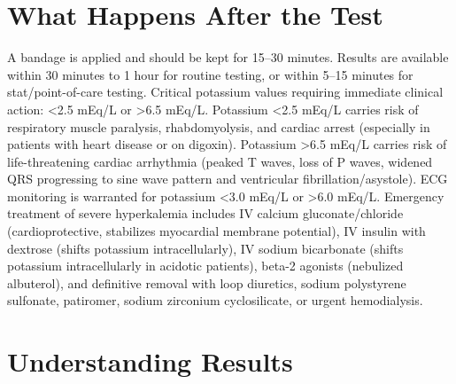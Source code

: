 \section*{What Happens After the Test}
A bandage is applied and should be kept for 15--30 minutes. Results are available within 30 minutes to 1 hour for routine testing, or within 5--15 minutes for stat/point-of-care testing. Critical potassium values requiring immediate clinical action: <2.5 mEq/L or >6.5 mEq/L. Potassium <2.5 mEq/L carries risk of respiratory muscle paralysis, rhabdomyolysis, and cardiac arrest (especially in patients with heart disease or on digoxin). Potassium >6.5 mEq/L carries risk of life-threatening cardiac arrhythmia (peaked T waves, loss of P waves, widened QRS progressing to sine wave pattern and ventricular fibrillation/asystole). ECG monitoring is warranted for potassium <3.0 mEq/L or >6.0 mEq/L. Emergency treatment of severe hyperkalemia includes IV calcium gluconate/chloride (cardioprotective, stabilizes myocardial membrane potential), IV insulin with dextrose (shifts potassium intracellularly), IV sodium bicarbonate (shifts potassium intracellularly in acidotic patients), beta-2 agonists (nebulized albuterol), and definitive removal with loop diuretics, sodium polystyrene sulfonate, patiromer, sodium zirconium cyclosilicate, or urgent hemodialysis.

\section*{Understanding Results}

